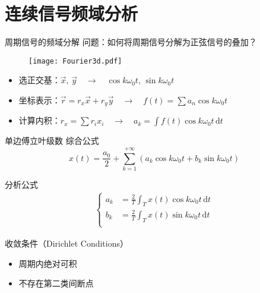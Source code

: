 \documentclass[UTF8]{ctexbeamer}
\begin{document}
\section{连续信号频域分析}

\begin{frame}{周期信号的频域分解}
    问题：如何将周期信号分解为正弦信号的叠加？

    \begin{figure}
        \centering
        \texttt{[image: Fourier3d.pdf]}
    \end{figure}

    \small
    \begin{tcolorbox}[boxrule=0.3pt,
        fontupper = \zihao{-5}\normalcolor]
        \begin{itemize}
            \item 选正交基：$\vec{x},\, \vec{y} \quad\rightarrow\quad \cos k \omega_0 t ,\, \sin k\omega_0 t$
            \item 坐标表示：$\vec{r} = r_x \vec{x} + r_y \vec{y}  \quad\rightarrow\quad f(t) = \sum a_n \cos  k \omega_0 t$
            \item 计算内积：$r_x = \sum r_i x_i \quad\rightarrow\quad a_k = \int f(t) \cos k \omega_0 t\, \mathrm{d}t$ 
        \end{itemize}
    \end{tcolorbox}
\end{frame}


\begin{frame}{单边傅立叶级数}
    综合公式
    \begin{equation*}
        x(t) = \frac{a_0}{2} + \sum_{k=1}^{+\infty} \left(a_k \cos k\omega_0t + b_k \sin k\omega_0t\right)
    \end{equation*}

    分析公式
    \begin{gather*}
        \left\{\begin{aligned}
            a_k &= \frac{2}{T} \int_T x(t) \cos k\omega_0t \,\mathrm{d}t \\
            b_k &= \frac{2}{T} \int_T x(t) \sin k\omega_0t \,\mathrm{d}t \\
        \end{aligned}\right.
    \end{gather*}

    收敛条件（Dirichlet Conditions）
    \begin{itemize}
        \item 周期内绝对可积
        \item 不存在第二类间断点
    \end{itemize}
\end{frame}
\end{document}
